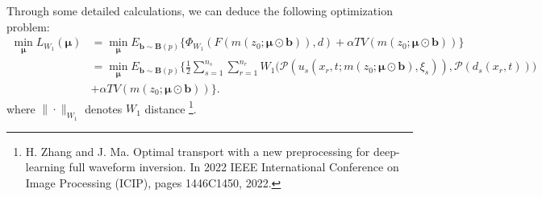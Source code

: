 \documentclass[mathserif,envcountsect,compress,8pt]{beamer}
\begin{document}
\begin{frame}
	\setlength{\parskip}{0.6\baselineskip}
	Through some detailed calculations, we can deduce the following optimization problem:
	{\color{orange}
	\begin{align*}
		\mathop{\min}_{\bm{\mu}}L_{W_1}(\bm{\mu}) & =\mathop{\min}_{\bm{\mu}}E_{\bm{b}\sim \bm{B}(p)}\big\{\Phi_{W_1}(F(m(z_0;\bm{\mu}\odot \bm{b})),d)+\alpha TV(m(z_0;\bm{\mu}\odot\bm{b}))\big\}                                                   \\ \nonumber
		                                          & =\mathop{\min}_{\bm{\mu}}E_{\bm{b}\sim \bm{B}(p)}\big\{\frac{1}{2}\sum_{s=1}^{n_s}\sum_{r=1}^{n_r}W_{1}\big(\mathcal{P}(u_s(x_r,t;m(z_0;\bm{\mu}\odot\bm{b}),\xi_s)),\mathcal{P}(d_s(x_r,t))\big) \\
		                                          & +\alpha TV(m(z_0;\bm{\mu}\odot\bm{b}))\big\}.
	\end{align*}}
	where $\|\cdot\|_{W_1}$ denotes $W_1$ distance \footnote{\tiny H. Zhang and J. Ma. Optimal transport with a new preprocessing for deep-learning full
		waveform inversion. In 2022 IEEE International Conference on Image Processing (ICIP),
		pages 1446C1450, 2022.}.
\end{frame}

%
\end{document}
